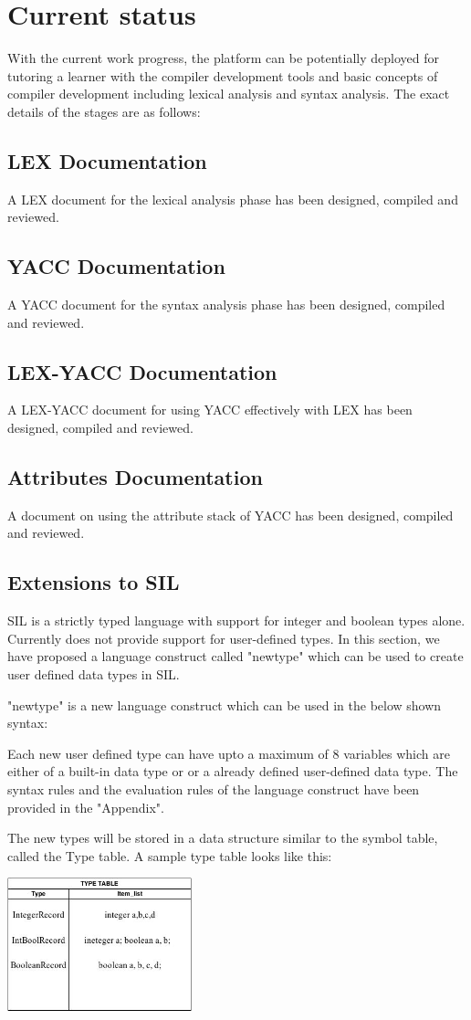 \chapter{Current status}
With the current work progress, the platform can be potentially deployed for tutoring a learner with the compiler development tools and basic concepts of compiler development including lexical analysis and syntax analysis. The exact details of the stages are as follows: 
\section{LEX Documentation}
A LEX document for the lexical analysis phase has been designed, compiled and reviewed. 
\section{YACC Documentation}
A YACC document for the syntax analysis phase has been designed, compiled and reviewed.
\section{LEX-YACC Documentation}
A LEX-YACC document for using YACC effectively with LEX has been designed, compiled and reviewed.
\section{Attributes Documentation}
A document on using the attribute stack of YACC has been designed, compiled and reviewed.  
\section{Extensions to SIL}
SIL is a strictly typed language with support for integer and boolean types alone. Currently does not provide support for user-defined types. In this section, we have proposed a language construct called "newtype" which can be used to create user defined data types in SIL.

"newtype" is a new language construct which can be used in the below shown syntax:

Each new user defined type can have upto a maximum of 8 variables which are either of a built-in data type or or a already defined user-defined data type. The syntax rules and the evaluation rules of the language construct have been provided in the "Appendix". 

The new types will be stored in a data structure similar to the symbol table, called the Type table. A sample type table looks like this:
\linebreak
\begin{center}
\includegraphics[width=0.4\textwidth]{./type_table.jpg}\\[1in]
\end{center}


